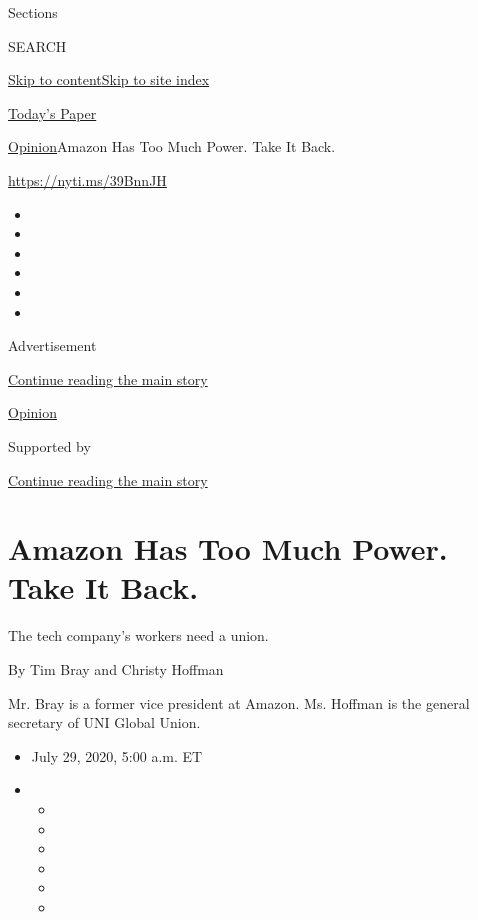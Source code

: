 Sections

SEARCH

\protect\hyperlink{site-content}{Skip to
content}\protect\hyperlink{site-index}{Skip to site index}

\href{https://myaccount.nytimes.com/auth/login?response_type=cookie\&client_id=vi}{}

\href{https://www.nytimes.com/section/todayspaper}{Today's Paper}

\href{/section/opinion}{Opinion}\textbar{}Amazon Has Too Much Power.
Take It Back.

\url{https://nyti.ms/39BnnJH}

\begin{itemize}
\item
\item
\item
\item
\item
\item
\end{itemize}

Advertisement

\protect\hyperlink{after-top}{Continue reading the main story}

\href{/section/opinion}{Opinion}

Supported by

\protect\hyperlink{after-sponsor}{Continue reading the main story}

\hypertarget{amazon-has-too-much-power-take-it-back}{%
\section{Amazon Has Too Much Power. Take It
Back.}\label{amazon-has-too-much-power-take-it-back}}

The tech company's workers need a union.

By Tim Bray and Christy Hoffman

Mr. Bray is a former vice president at Amazon. Ms. Hoffman is the
general secretary of UNI Global Union.

\begin{itemize}
\item
  July 29, 2020, 5:00 a.m. ET
\item
  \begin{itemize}
  \item
  \item
  \item
  \item
  \item
  \item
  \end{itemize}
\end{itemize}

